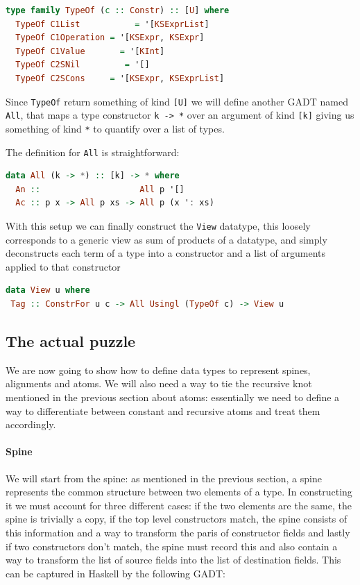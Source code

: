 \documentclass[11pt]{article}
\begin{document}
\begin{lstlisting}[language=haskell]
type family TypeOf (c :: Constr) :: [U] where
  TypeOf C1List           = '[KSExprList]
  TypeOf C1Operation = '[KSExpr, KSExpr]
  TypeOf C1Value       = '[KInt]
  TypeOf C2SNil         = '[]
  TypeOf C2SCons     = '[KSExpr, KSExprList]
\end{lstlisting}

Since \texttt{TypeOf} return something of kind \texttt{{[}U{]}} we will
define another GADT named \texttt{All}, that maps a type constructor
\texttt{k\ -\textgreater{}\ *} over an argument of kind \texttt{{[}k{]}}
giving us something of kind \texttt{*} to quantify over a list of types.

The definition for \texttt{All} is straightforward:

\begin{lstlisting}[language=haskell]
data All (k -> *) :: [k] -> * where
  An ::                    All p '[]
  Ac :: p x -> All p xs -> All p (x ': xs)
\end{lstlisting}

With this setup we can finally construct the \texttt{View} datatype,
this loosely corresponds to a generic view as sum of products of a
datatype, and simply deconstructs each term of a type into a constructor
and a list of arguments applied to that constructor

\begin{lstlisting}[language=haskell]
data View u where
 Tag :: ConstrFor u c -> All Usingl (TypeOf c) -> View u
\end{lstlisting}

\subsection{The actual puzzle}\label{the-actual-puzzle}

We are now going to show how to define data types to represent spines, 
alignments and atoms. We will also need a way to tie the recursive knot 
mentioned in the previous section about atoms: essentially we need to define a way to 
differentiate between constant and recursive atoms and treat them accordingly.

\paragraph{Spine}\label{spine-1}

We will start from the spine: as mentioned in the previous section, a
spine represents the common structure between two elements of a type. In
constructing it we must account for three different cases: if the two
elements are the same, the spine is trivially a copy, if the top level
constructors match, the spine consists of this information and a way to
transform the paris of constructor fields and lastly if two constructors
don't match, the spine must record this and also contain a way to
transform the list of source fields into the list of destination fields.
This can be captured in Haskell by the following GADT:
\end{document}
